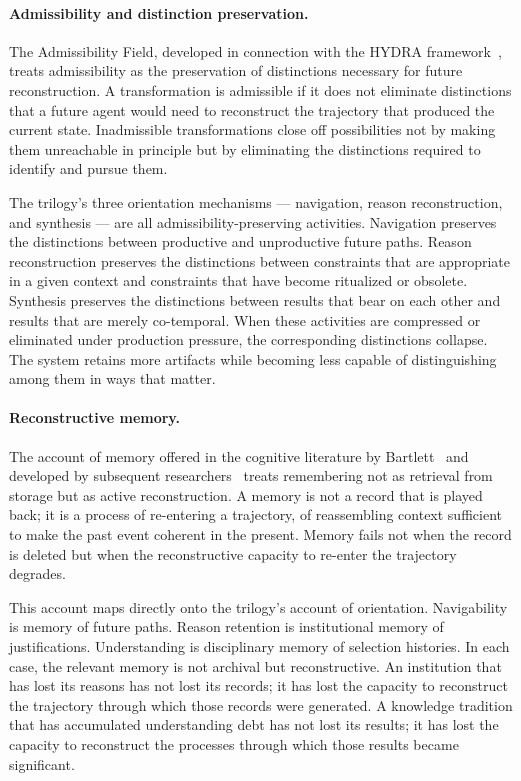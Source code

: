 \paragraph{Admissibility and distinction preservation.}
The Admissibility Field, developed in connection with the HYDRA
framework~\cite{hydra2025}, treats admissibility as the preservation of
distinctions necessary for future reconstruction. A transformation is admissible
if it does not eliminate distinctions that a future agent would need to
reconstruct the trajectory that produced the current state. Inadmissible
transformations close off possibilities not by making them unreachable in
principle but by eliminating the distinctions required to identify and pursue
them.

The trilogy's three orientation mechanisms --- navigation, reason reconstruction,
and synthesis --- are all admissibility-preserving activities. Navigation
preserves the distinctions between productive and unproductive future paths.
Reason reconstruction preserves the distinctions between constraints that
are appropriate in a given context and constraints that have become ritualized
or obsolete. Synthesis preserves the distinctions between results that bear
on each other and results that are merely co-temporal. When these activities
are compressed or eliminated under production pressure, the corresponding
distinctions collapse. The system retains more artifacts while becoming less
capable of distinguishing among them in ways that matter.

\paragraph{Reconstructive memory.}
The account of memory offered in the cognitive literature by Bartlett~\cite{bartlett1932}
and developed by subsequent researchers~\cite{hutchins1995} treats remembering
not as retrieval from storage but as active reconstruction. A memory is not
a record that is played back; it is a process of re-entering a trajectory,
of reassembling context sufficient to make the past event coherent in the
present. Memory fails not when the record is deleted but when the reconstructive
capacity to re-enter the trajectory degrades.

This account maps directly onto the trilogy's account of orientation. Navigability
is memory of future paths. Reason retention is institutional memory of justifications.
Understanding is disciplinary memory of selection histories. In each case,
the relevant memory is not archival but reconstructive. An institution that
has lost its reasons has not lost its records; it has lost the capacity to
reconstruct the trajectory through which those records were generated. A
knowledge tradition that has accumulated understanding debt has not lost its
results; it has lost the capacity to reconstruct the processes through which
those results became significant.

